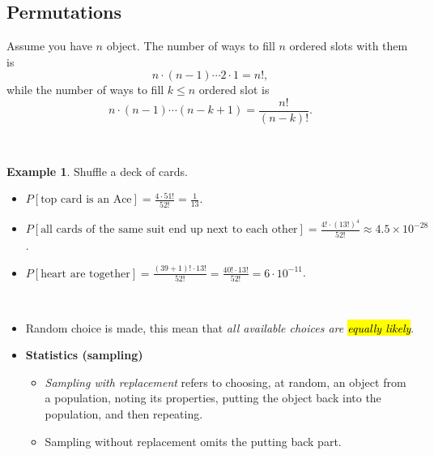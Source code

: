 \documentclass[12pt,a4paper]{article}
\theoremstyle{definition}
\newtheorem{example}{Example}[section]
\theoremstyle{definition}
\theoremstyle{definition}
\theoremstyle{definition}
\theoremstyle{remark}
\theoremstyle{definition}
\newcommand{\dispsty}{\displaystyle}
\begin{document}
\newpage
\subsection{Permutations}

\begin{tcolorbox}[colback=white]
	Assume you have $n$ object. The number of ways to fill $n$ ordered slots with them is \[
	n\cdot(n-1)\cdots2\cdot1=n!,
	\] while the number of ways to fill $k\leq n$ ordered slot is \[
	n\cdot(n-1)\cdots(n-k+1)=\frac{n!}{(n-k)!}.
	\]
\end{tcolorbox}
\
\begin{example}
	Shuffle a deck of cards.\begin{itemize}
		\item $\dispsty P[\text{top card is an Ace}]=\frac{4\cdot51!}{52!}=\frac{1}{13}$.
		\item $\dispsty P[\text{all cards of the same suit end up next to each other}]=\frac{4!\cdot(13!)^4}{52!}\approx4.5\times10^{-28}$.
		\item $\dispsty P[\text{heart are together}]=\frac{(39+1)!\cdot13!}{52!}=\frac{40!\cdot13!}{52!}=6\cdot10^{-11}$.
	\end{itemize}
\end{example}
\
\begin{tcolorbox}[colback=white]
\begin{itemize}
	\item Random choice is made, this mean that \textit{all available choices are \hl{equally likely}}.
	\item \textbf{Statistics (sampling)}\begin{itemize}
		\item \textit{Sampling with replacement} refers to choosing, at random, an object from a population, noting its properties, putting the object back into the population, and then repeating.
		\item Sampling without replacement omits the putting back part.
	\end{itemize}
\end{itemize}
\end{tcolorbox}
\
\end{document}
